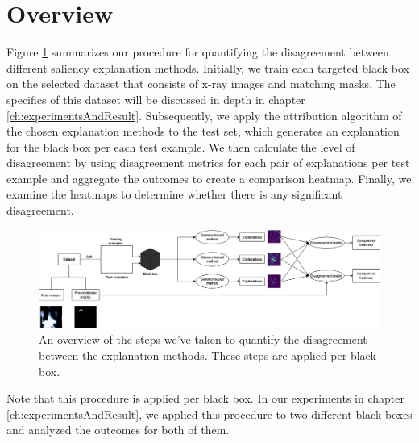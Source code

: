 \section{Overview}
\label{sec:methodOverview}
Figure \ref{fig:methodOverview} summarizes our procedure for quantifying the disagreement between different saliency explanation methods. Initially, we train each targeted black box on the selected dataset that consists of x-ray images and matching masks. The specifics of this dataset will be discussed in depth in chapter \ref{ch:experimentsAndResult}. Subsequently, we apply the attribution algorithm of the chosen explanation methods to the test set, which generates an explanation for the black box per each test example. We then calculate the level of disagreement by using disagreement metrics for each pair of explanations per test example and aggregate the outcomes to create a comparison heatmap. Finally, we examine the heatmaps to determine whether there is any significant disagreement.

\begin{figure}
    \centering
    \includegraphics[width=\textwidth]{images/method-overview.png}
    \caption{An overview of the steps we've taken to quantify the disagreement between the explanation methods. These steps are applied per black box.}
    \label{fig:methodOverview}
\end{figure}

Note that this procedure is applied per black box. In our experiments in chapter \ref{ch:experimentsAndResult}, we applied this procedure to two different black boxes and analyzed the outcomes for both of them.